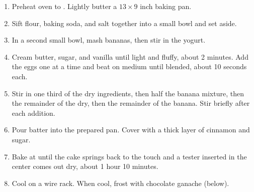 
\begin{ingredients}
\end{ingredients}


\begin{recipe}
  \begin{enumerate}

  \item Preheat oven to .  Lightly butter a $13\times 9$ inch
    baking pan.

  \item Sift flour, baking soda, and salt together into a small bowl
    and set aside.

  \item In a second small bowl, mash bananas, then stir in the yogurt.

  \item Cream butter, sugar, and vanilla until light and fluffy,
    about 2 minutes.  Add the eggs one at a time and beat on medium
    until blended, about 10 seconds each.

  \item Stir in one third of the dry ingredients, then half the banana
    mixture, then the remainder of the dry, then the remainder of the
    banana.  Stir briefly after each addition.

  \item Pour batter into the prepared pan.  Cover with a thick layer
    of cinnamon and sugar.

  \item Bake at  until the cake springs back to the touch and a
    tester inserted in the center comes out dry, about 1 hour 10
    minutes.

  \item Cool on a wire rack.  When cool, frost with chocolate ganache (below).

  \end{enumerate}
\end{recipe}


